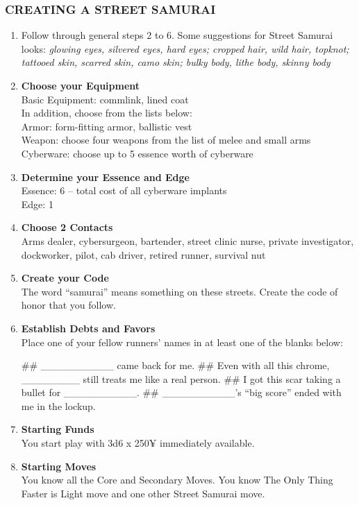 \subsubsection{CREATING A STREET SAMURAI}
\begin{enumerate}
    \item Follow through general steps 2 to 6. Some suggestions for Street Samurai looks: \textit{glowing eyes, silvered eyes, hard eyes; cropped hair, wild hair, topknot; tattooed skin, scarred skin, camo skin; bulky body, lithe body, skinny body}
    
    \item \textbf{Choose your Equipment} \\
    Basic Equipment: commlink, lined coat \\
    In addition, choose from the lists below: \\
    Armor: form-fitting armor, ballistic vest \\
    Weapon: choose four weapons from the list of melee and small arms \\
    Cyberware: choose up to 5 essence worth of cyberware
    
    \item \textbf{Determine your Essence and Edge} \\
    Essence: 6 – total cost of all cyberware implants \\
    Edge: 1
    
    \item \textbf{Choose 2 Contacts} \\
    Arms dealer, cybersurgeon, bartender, street clinic nurse, private investigator, dockworker, pilot, cab driver, retired runner, survival nut
    
    \item \textbf{Create your Code} \\
    The word “samurai” means something on these streets. Create the code of honor that you follow.
    
    \item \textbf{Establish Debts and Favors} \\
    Place one of your fellow runners’ names in at least one of the blanks below:
        \begin{easylist}
            ## \_\_\_\_\_\_\_\_\_\_ came back for me.
            ## Even with all this chrome, \_\_\_\_\_\_\_\_ still treats me like a real person.
            ## I got this scar taking a bullet for \_\_\_\_\_\_\_\_\_\_.
            ## \_\_\_\_\_\_\_\_\_\_’s “big score” ended with me in the lockup.
        \end{easylist}            
    
    \item \textbf{Starting Funds} \\
    You start play with 3d6 x 250¥ immediately available.
    
    \item \textbf{Starting Moves} \\
    You know all the Core and Secondary Moves. You know The Only Thing Faster is Light move and one other Street Samurai move.
\end{enumerate}

